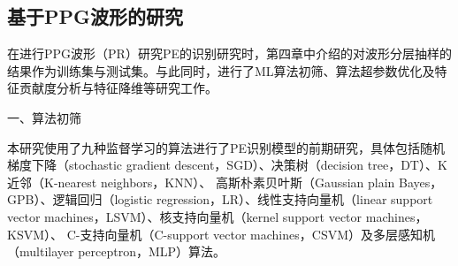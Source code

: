 \subsection{基于PPG波形的研究}

在进行PPG波形（PR）研究PE的识别研究时，第四章中介绍的对波形分层抽样的结果作为训练集与测试集。与此同时，进行了ML算法初筛、算法超参数优化及特征贡献度分析与特征降维等研究工作。

一、算法初筛

本研究使用了九种监督学习的算法进行了PE识别模型的前期研究，具体包括随机梯度下降（stochastic gradient descent，SGD）、决策树（decision tree，DT）、K近邻（K-nearest neighbors，KNN）、
高斯朴素贝叶斯（Gaussian plain Bayes，GPB）、逻辑回归（logistic regression，LR）、线性支持向量机（linear support vector machines，LSVM）、核支持向量机（kernel support vector machines，KSVM）、
C-支持向量机（C-support vector machines，CSVM）及多层感知机（multilayer perceptron，MLP）算法。

